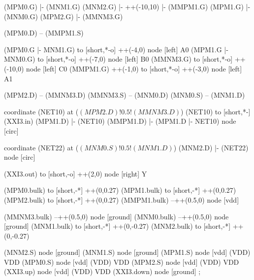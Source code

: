 \begin{circuitikz}[american]

	(MPM0.G) |- (MNM1.G)
	(MNM2.G) |- ++(-10,10) |- (MMPM1.G)
	(MPM1.G) |- (MNM0.G)
	(MPM2.G) |- (MMNM3.G)
	
	(MPM0.D) -- (MMPM1.S)
	
	(MPM0.G |- MNM1.G) to [short,*-o] ++(-4,0) node [left] {A0}
	(MPM1.G |- MNM0.G) to [short,*-o] ++(-7,0) node [left] {B0}
	(MMNM3.G) to [short,*-o] ++(-10,0) node [left] {C0}
	(MMPM1.G) ++(-1,0) to [short,*-o] ++(-3,0) node [left] {A1}
	
	(MPM2.D) -- (MMNM3.D)
	(MMNM3.S) -- (MNM0.D)
	(MNM0.S) -- (MNM1.D)
	
	coordinate (NET10) at ($(MPM2.D)!0.5!(MMNM3.D)$)
	(NET10) to [short,*-] (XXI3.in)
	(MPM1.D) |- (NET10)
	(MMPM1.D) |- (MPM1.D |- NET10) node [circ] {}
	
	coordinate (NET22) at ($(MNM0.S)!0.5!(MNM1.D)$)
	(MNM2.D) |- (NET22) node [circ] {}
	
	(XXI3.out) to [short,-o] ++(2,0) node [right] {Y}
	
	(MPM0.bulk) to [short,-*] ++(0,0.27)
	(MPM1.bulk) to [short,-*] ++(0,0.27)	
	(MPM2.bulk) to [short,-*] ++(0,0.27)	
	(MMPM1.bulk) --++(0.5,0) node [vdd]{}
	
	(MMNM3.bulk) --++(0.5,0) node [ground]{}
	(MNM0.bulk) --++(0.5,0) node [ground]{}
	(MNM1.bulk) to [short,-*] ++(0,-0.27)
	(MNM2.bulk) to [short,-*] ++(0,-0.27)


	(MNM2.S) node [ground] {}
	(MNM1.S) node [ground] {}
	(MPM1.S) node [vdd] (VDD) {VDD}
	(MPM0.S) node [vdd] (VDD) {VDD}
	(MPM2.S) node [vdd] (VDD) {VDD}
	(XXI3.up) node [vdd] (VDD) {VDD}
	(XXI3.down) node [ground] {}
;

\end{circuitikz}
